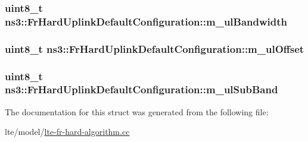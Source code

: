 \subsubsection[{\texorpdfstring{m\+\_\+ul\+Bandwidth}{m_ulBandwidth}}]{\setlength{\rightskip}{0pt plus 5cm}uint8\+\_\+t ns3\+::\+Fr\+Hard\+Uplink\+Default\+Configuration\+::m\+\_\+ul\+Bandwidth}\hypertarget{structns3_1_1FrHardUplinkDefaultConfiguration_a6559b272098c06d135a52b0565567b17}{}\label{structns3_1_1FrHardUplinkDefaultConfiguration_a6559b272098c06d135a52b0565567b17}
\subsubsection[{\texorpdfstring{m\+\_\+ul\+Offset}{m_ulOffset}}]{\setlength{\rightskip}{0pt plus 5cm}uint8\+\_\+t ns3\+::\+Fr\+Hard\+Uplink\+Default\+Configuration\+::m\+\_\+ul\+Offset}\hypertarget{structns3_1_1FrHardUplinkDefaultConfiguration_aa974511f8dafa96fa1dd406f4e6ea531}{}\label{structns3_1_1FrHardUplinkDefaultConfiguration_aa974511f8dafa96fa1dd406f4e6ea531}
\subsubsection[{\texorpdfstring{m\+\_\+ul\+Sub\+Band}{m_ulSubBand}}]{\setlength{\rightskip}{0pt plus 5cm}uint8\+\_\+t ns3\+::\+Fr\+Hard\+Uplink\+Default\+Configuration\+::m\+\_\+ul\+Sub\+Band}\hypertarget{structns3_1_1FrHardUplinkDefaultConfiguration_a70dc0aa992c216181d96488a9ed1d93a}{}\label{structns3_1_1FrHardUplinkDefaultConfiguration_a70dc0aa992c216181d96488a9ed1d93a}


The documentation for this struct was generated from the following file\+:\begin{DoxyCompactItemize}
\item 
lte/model/\hyperlink{lte-fr-hard-algorithm_8cc}{lte-\/fr-\/hard-\/algorithm.\+cc}\end{DoxyCompactItemize}
